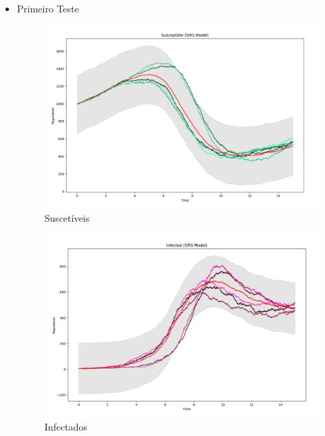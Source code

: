 \documentclass[a4paper, 12pt]{article}
\begin{document}
\pagebreak

\begin{itemize}
    \item Primeiro Teste
    \begin{figure}[H]
        \centering
        \includegraphics[width=1\textwidth]{Images/Exercise 5/Scenario 1/s1a.png}
        \vspace*{-1cm}
        \caption{Suscetíveis}
        \label{fig:exampleFig15}
    \end{figure}
    
    \begin{figure}[H]
        \centering
        \includegraphics[width=1\textwidth]{Images/Exercise 5/Scenario 1/i1a.png}
        \vspace*{-1cm}
        \caption{Infectados}
        \label{fig:exampleFig16}
    \end{figure}
    

\end{itemize}
\end{document}
